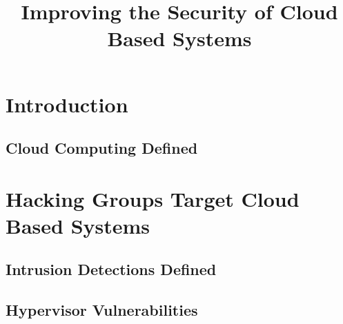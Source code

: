 \documentclass[conference]{IEEEtran}
\begin{document}
%
\title{Improving the Security of Cloud Based Systems}


\author{
}







\maketitle


\begin{abstract}

\end{abstract}

\section{Introduction}

\subsection{Cloud Computing Defined}


\section{Hacking Groups Target Cloud Based Systems}

\subsection{Intrusion Detections Defined}

\subsection{Hypervisor Vulnerabilities}

\end{document}
